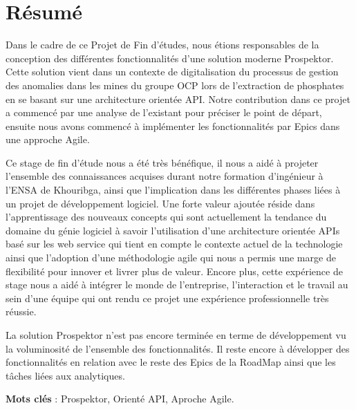 \chapter*{R\'esum\'e}

Dans le cadre de ce Projet de Fin d'\'etudes, nous \'etions responsables de la conception des diff\'erentes fonctionnalit\'es d'une solution moderne Prospektor. Cette solution vient dans un contexte de digitalisation du processus de gestion des anomalies dans les mines du groupe \gls{OCP} lors de l'extraction de phosphates en se basant sur une architecture orient\'ee \gls{API}. Notre contribution dans ce projet a commenc\'e par une analyse de l'existant pour pr\'eciser le point de d\'epart, ensuite nous avons commenc\'e \`a impl\'ementer les fonctionnalit\'es par Epics dans une approche Agile.

Ce stage de fin d'\'etude nous a \'et\'e tr\`es b\'en\'efique, il nous a aid\'e \`a projeter l'ensemble des connaissances acquises durant notre formation d'ing\'enieur \`a l'ENSA de Khouribga, ainsi que l'implication dans les diff\'erentes phases li\'ees \`a un projet de d\'eveloppement logiciel. Une forte valeur ajout\'ee r\'eside dans l'apprentissage des nouveaux concepts qui sont actuellement la tendance du domaine du g\'enie logiciel \`a savoir l'utilisation d'une architecture orient\'ee \gls{API}s bas\'e sur les web service qui tient en compte le contexte actuel de la technologie ainsi que l'adoption d'une m\'ethodologie agile qui nous a permis une marge de flexibilit\'e pour innover et livrer plus de valeur. Encore plus, cette exp\'erience de stage nous a aid\'e \`a int\'egrer le monde de l'entreprise, l'interaction et le travail au sein d'une \'equipe qui ont rendu ce projet une exp\'erience professionnelle tr\`es r\'eussie.

La solution Prospektor n'est pas encore termin\'ee en terme de d\'eveloppement vu la voluminosit\'e de l'ensemble des fonctionnalit\'es. Il reste encore \`a d\'evelopper des fonctionnalit\'es en relation avec le reste des Epics de la RoadMap ainsi que les t\^aches li\'ees aux analytiques.

\vspace{1.5\baselineskip}

\textbf{Mots cl\'es} : Prospektor, Orient\'e API, Aproche Agile.